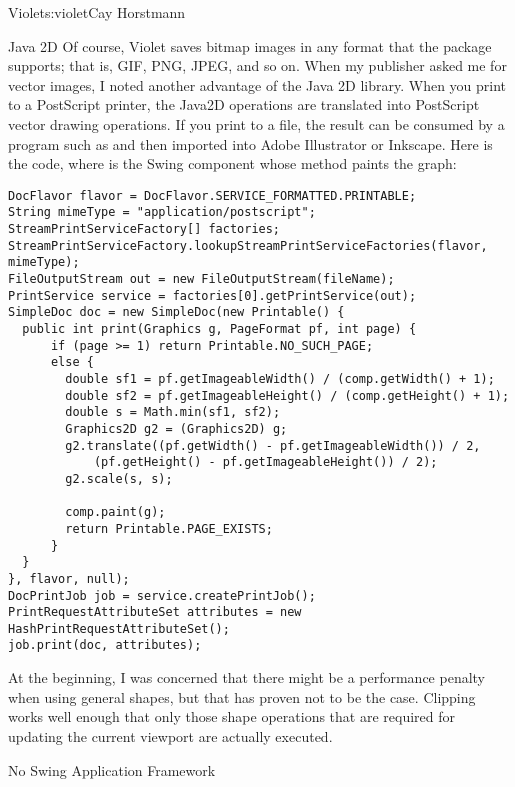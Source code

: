 \begin{aosachapter}{Violet}{s:violet}{Cay Horstmann}
\begin{aosasect1}{Java 2D}
Of course, Violet saves bitmap images in any format that the
 package supports; that is, GIF, PNG, JPEG, and so
on. When my publisher asked me for vector images, I noted another
advantage of the Java 2D library. When you print to a PostScript
printer, the Java2D operations are translated into PostScript vector
drawing operations. If you print to a file, the result can be consumed
by a program such as  and then imported into Adobe
Illustrator or Inkscape. Here is the code, where  is the
Swing component whose  method paints the graph:

\begin{verbatim}
DocFlavor flavor = DocFlavor.SERVICE_FORMATTED.PRINTABLE;
String mimeType = "application/postscript";
StreamPrintServiceFactory[] factories;
StreamPrintServiceFactory.lookupStreamPrintServiceFactories(flavor, mimeType);
FileOutputStream out = new FileOutputStream(fileName);
PrintService service = factories[0].getPrintService(out);            
SimpleDoc doc = new SimpleDoc(new Printable() {
  public int print(Graphics g, PageFormat pf, int page) {
      if (page >= 1) return Printable.NO_SUCH_PAGE;
      else {
        double sf1 = pf.getImageableWidth() / (comp.getWidth() + 1);
        double sf2 = pf.getImageableHeight() / (comp.getHeight() + 1);
        double s = Math.min(sf1, sf2);
        Graphics2D g2 = (Graphics2D) g;
        g2.translate((pf.getWidth() - pf.getImageableWidth()) / 2, 
            (pf.getHeight() - pf.getImageableHeight()) / 2);
        g2.scale(s, s);
                        
        comp.paint(g);
        return Printable.PAGE_EXISTS;
      }
  }
}, flavor, null);
DocPrintJob job = service.createPrintJob();
PrintRequestAttributeSet attributes = new HashPrintRequestAttributeSet();
job.print(doc, attributes);
\end{verbatim}

At the beginning, I was concerned that there might be a performance
penalty when using general shapes, but that has proven not to be the
case. Clipping works well enough that only those shape operations
that are required for updating the current viewport are actually
executed.

\end{aosasect1}

\begin{aosasect1}{No Swing Application Framework}


\end{aosasect1}
\end{aosachapter}
